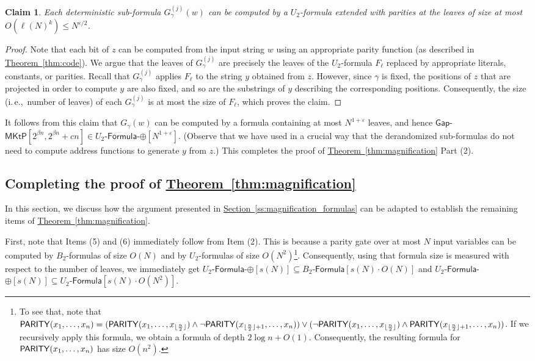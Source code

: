 \documentclass[11pt]{article}
\numberwithin{equation}{section}
\newtheorem{claim}[theorem]{Claim}
\theoremstyle{definition}
\theoremstyle{plain}
\newcommand{\ie}{i.\,e.}
\newcommand{\expref}[2]{\hyperref[#2]{#1~\ref{#2}}}
\newcommand{\PARITY}{\ensuremath{{\sf PARITY}}\xspace}
\newcommand{\gapmktp}{\mathsf{Gap}$-$\mathsf{MKtP}}
\begin{document}
\begin{claim}
Each deterministic sub-formula $G_\gamma^{(j)}(w)$ can be computed by a $U_2$-formula extended with parities at the leaves of size at most $O(\ell(N)^k) \leq N^{\varepsilon/2}$.
\end{claim}

\begin{proof}
Note that each bit of $z$ can be computed from the input string $w$ using an appropriate parity function (as described in \expref{Theorem}{thm:code}). We argue that the leaves of $G_\gamma^{(j)}$ are precisely the leaves of the $U_2$-formula $F_{\ell}$ replaced by appropriate literals, constants, or parities. Recall that $G_\gamma^{(j)}$ applies $F_\ell$ to the string $y$ obtained from $z$. However, since $\gamma$ is fixed, the positions of $z$ that are projected in order to compute $y$ are also fixed, and so are the substrings of $y$ describing the corresponding positions. Consequently, the size (\ie,~number of leaves) of each $G^{(j)}_\gamma$ is at most the size of $F_\ell$, which proves the claim.
\end{proof}

It follows from this claim that $G_\gamma(w)$ can be computed by a formula containing at most $N^{1 + \varepsilon}$ leaves, and hence $\gapmktp[2^{\beta n}, 2^{\beta n} + cn] \in U_2$-$\mathsf{Formula}$-$\oplus[N^{1 + \varepsilon}]$. (Observe that we have used in a crucial way that the derandomized sub-formulas do not need to compute address functions to generate $y$ from $z$.) This completes the proof of \expref{Theorem}{thm:magnification} Part (2). 


\subsection{Completing the proof of \expref{Theorem}{thm:magnification}}\label{ss:consequences}

In this section, we discuss how the argument presented in \expref{Section}{ss:magnification_formulas} can be adapted to establish the remaining items of \expref{Theorem}{thm:magnification}.

First, note that Items (5) and (6) immediately follow from Item (2). This is because a parity gate over at most $N$ input variables can be computed by $B_2$-formulas of size $O(N)$ and by $U_2$-formulas of size $O(N^2)$\footnote{To see that, note that $\PARITY(x_1,\dots,x_n)=(\PARITY(x_1,\dots,x_{\lfloor\frac{n}{2}\rfloor})\wedge \neg\PARITY(x_{\lfloor\frac{n}{2}\rfloor+1},\dots,x_n))\vee (\neg\PARITY(x_1,\dots,x_{\lfloor\frac{n}{2}\rfloor})\wedge \PARITY(x_{\lfloor\frac{n}{2}\rfloor+1},\dots,x_n))$. If we recursively apply this formula, we obtain a formula of depth $2\log n+O(1)$. 
Consequently, the resulting formula for $\PARITY(x_1,\dots,x_n)$ has size $O(n^{2})$.}. Consequently, using that formula size is measured with respect to the number of leaves, we immediately get $U_2$-$\mathsf{Formula}$-$\oplus[s(N)] \subseteq B_2$-$\mathsf{Formula}[s(N) \cdot O(N)]$ and $U_2$-$\mathsf{Formula}$-$\oplus[s(N)] \subseteq U_2$-$\mathsf{Formula}[s(N) \cdot O(N^2)]$.
\end{document}
